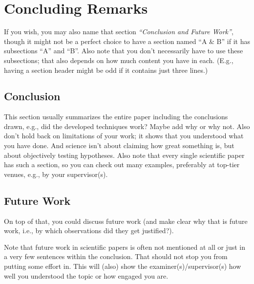 \chapter{Concluding Remarks}\label{chap:conclusion}

If you wish, you may also name that section \emph{``Conclusion and Future Work''}, though it might not be a perfect choice to have a section named ``A \& B'' if it has subsections ``A'' and ``B''. Also note that you don't necessarily have to use these subsections; that also depends on how much content you have in each. (E.g., having a section header might be odd if it contains just three lines.)


\section{Conclusion}

This section usually summarizes the entire paper including the conclusions drawn, e.g., did the developed techniques work? Maybe add why or why not. Also don't hold back on limitations of your work; it shows that you understood what you have done. And science isn't about claiming how great something is, but about objectively testing hypotheses. Also note that every single scientific paper has such a section, so you can check out many examples, preferably at top-tier venues, e.g., by your supervisor(s).


\section{Future Work}

On top of that, you could discuss future work (and make clear why that is future work, i.e., by which observations did they get justified?).

Note that future work in scientific papers is often not mentioned at all or just in a very few sentences within the conclusion. That should not stop you from putting some effort in. This will (also) show the examiner(s)/supervisor(s) how well you understood the topic or how engaged you are.
